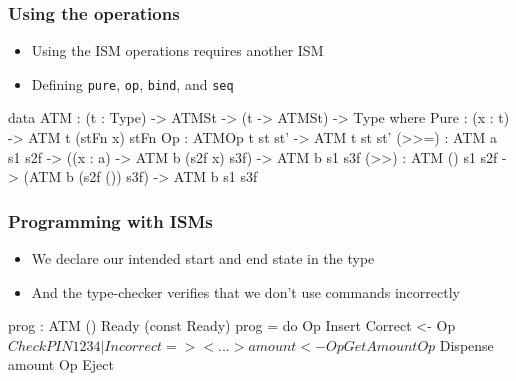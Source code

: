 \documentclass[compress,handout]{beamer}
\begin{document}
\begin{frame}[fragile]
  \frametitle{Using the operations}

  \begin{itemize}
    \item Using the ISM operations requires another ISM
    \item Defining \texttt{pure}, \texttt{op}, \texttt{bind}, and \texttt{seq}
  \end{itemize}

  \begin{idrislisting}
data ATM : (t : Type) -> ATMSt -> (t -> ATMSt) -> Type
  where
  Pure : (x : t) -> ATM t (stFn x) stFn
  Op : ATMOp t st st' -> ATM t st st'
  (>>=) :  ATM a s1 s2f -> ((x : a) -> ATM b (s2f x) s3f)
        -> ATM b s1 s3f
  (>>) :  ATM () s1 s2f -> (ATM b (s2f ()) s3f)
       -> ATM b s1 s3f
  \end{idrislisting}
\end{frame}


\begin{frame}[fragile]
  \frametitle{Programming with ISMs}

  \begin{itemize}
    \item We declare our intended start and end state in the type
    \item And the type-checker verifies that we don't use commands incorrectly
  \end{itemize}

  \vspace*{-5mm}

  \begin{idrislisting}
  prog : ATM () Ready (const Ready)
  prog = do
    Op Insert
    Correct <- Op $ CheckPIN 1234
      | Incorrect => <...>
    amount <- Op GetAmount
    Op $ Dispense amount
    Op Eject
  \end{idrislisting}

\end{frame}
\end{document}

